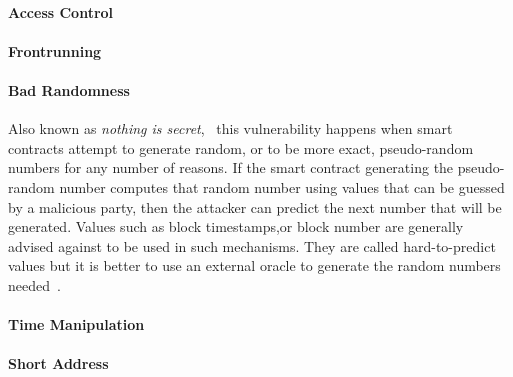             \paragraph{Access Control}
                

            \paragraph{Frontrunning}
                

            \paragraph{Bad Randomness}
            Also known as \textit{nothing is secret},~\cite{dasp} this vulnerability happens when smart contracts attempt to generate random, or to be more exact, pseudo-random numbers for any number of reasons.
            If the smart contract generating the pseudo-random number computes that random number using values that can be guessed by a malicious party, then the attacker can predict the next number that will be generated.
            Values such as block timestamps,or block number are generally advised against to be used in such mechanisms. They are called hard-to-predict values but it is better to use an external oracle to generate the random numbers needed~\cite{swcregistry}.

                
        
            \paragraph{Time Manipulation}
                
        
            \paragraph{Short Address}
                
